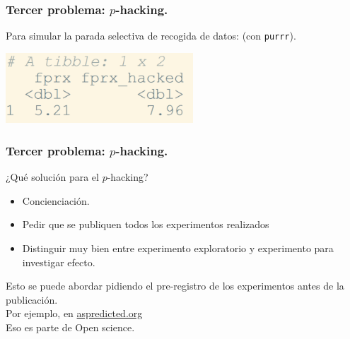\documentclass[9pt]{beamer}
\begin{document}
\begin{frame}
  \frametitle{Tercer problema: $p$-hacking.}
    \begin{overlayarea}{\textwidth}{\textheight}
  Para simular la parada selectiva de recogida de datos: \alert{(con
  {\tt purrr})}.\\
\begin{center}
\includegraphics[width=7cm]{images/resultados_select_size}  
\end{center}

\end{overlayarea}
\end{frame}

\begin{frame}
  \frametitle{Tercer problema: $p$-hacking.}
  ¿Qué solución para el $p$-hacking?\onslide<+->
  \begin{itemize}
  \item<+-> Concienciación.
  \item<+-> Pedir que se publiquen todos los experimentos realizados
  \item<+-> Distinguir muy bien entre experimento exploratorio y
    experimento para investigar efecto.   
  \end{itemize}
  \onslide<+-> Esto se puede abordar pidiendo el pre-registro de los
  experimentos antes de la publicación.\\ 
  \onslide<+-> Por ejemplo, en
  \href{https://aspredicted.org}{aspredicted.org}\\
  \onslide<+-> Eso es parte de Open science.
  
\end{frame}
\end{document}
